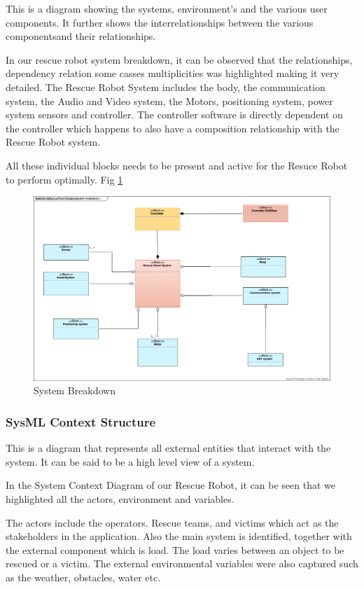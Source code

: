 \documentclass[10pt,journal,compsoc]{IEEEtran}
\begin{document}
This is a diagram showing the systems, environment’s and the various user components. It further shows the interrelationships between the various componentsand their relationships. 

In our rescue robot system breakdown, it can  be observed that the relationships, dependency relation some casses multiplicities was highlighted making it very detailed. The Rescue Robot System includes the body, the communication system, the Audio and Video system, the Motors, positioning system, power system sensors and controller. The controller software is directly dependent on the controller which happens to also have a composition relationship with the Rescue Robot system. 

All these individual blocks needs to be present and active for the Resuce Robot to perform optimally. Fig \ref{fig:breakdown}

\begin{figure}[h]
\includegraphics[scale=0.19]{SystemBreakdown}
\caption{System Breakdown}
\label{fig:breakdown}
\end{figure}

\subsubsection{SysML Context Structure }

This is a diagram that represents all external entities that interact with the system. It can be said to be a high level view of a system. 

In the System Context Diagram of our Rescue Robot, it can be seen that we highlighted all the actors, environment and variables.

The actors include the operators. Rescue teams, and victims which act as the stakeholders in the application. Also the main system is identified, together with the external component which is load. The load varies between an object to be rescued or a victim. The external environmental variables were also captured such as the weather, obstacles, water etc.
\end{document}
